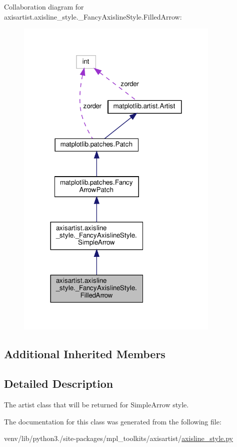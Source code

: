 Collaboration diagram for axisartist.\+axisline\+\_\+style.\+\_\+\+Fancy\+Axisline\+Style.\+Filled\+Arrow\+:
\nopagebreak
\begin{figure}[H]
\begin{center}
\leavevmode
\includegraphics[width=276pt]{classaxisartist_1_1axisline__style_1_1__FancyAxislineStyle_1_1FilledArrow__coll__graph}
\end{center}
\end{figure}
\subsection*{Additional Inherited Members}


\subsection{Detailed Description}
\begin{DoxyVerb}The artist class that will be returned for SimpleArrow style.
\end{DoxyVerb}
 

The documentation for this class was generated from the following file\+:\begin{DoxyCompactItemize}
\item 
venv/lib/python3./site-\/packages/mpl\+\_\+toolkits/axisartist/\hyperlink{axisartist_2axisline__style_8py}{axisline\+\_\+style.\+py}\end{DoxyCompactItemize}
